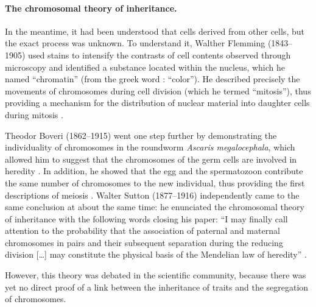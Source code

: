 





\paragraph{The chromosomal theory of inheritance.}
In the meantime, it had been understood that cells derived from other cells, but the exact process was unknown. 
To understand it, Walther Flemming (1843--1905) used stains to intensify the contrasts of cell contents observed through microscopy and identified a substance located within the nucleus, which he named “chromatin” (from the greek word \textit{\textchi\textrho\textomega\textmu\textalpha}: “color”).
He described precisely the movements of chromosomes during cell division (which he termed “mitosis”), thus providing a mechanism for the distribution of nuclear material into daughter cells during mitosis \citep{flemming1879contributions}.

Theodor Boveri (1862--1915) went one step further by demonstrating the individuality of chromosomes in the roundworm \textit{Ascaris megalocephala}, which allowed him to suggest that the chromosomes of the germ cells are involved in heredity \citep{boveri1888zellen}.
In addition, he showed that the egg and the spermatozoon contribute the same number of chromosomes to the new individual, thus providing the first descriptions of meiosis \citep{boveri1890zellen}.
Walter Sutton (1877--1916) independently came to the same conclusion at about the same time: he enunciated the chromosomal theory of inheritance with the following words closing his  paper: “I may finally call attention to the probability that the association of paternal and maternal chromosomes in pairs and their subsequent separation during the reducing division […] may constitute the physical basis of the Mendelian law of heredity” \citep{sutton1902morphology}.

However, this theory was debated in the scientific community, because there was yet no direct proof of a link between the inheritance of traits and the segregation of chromosomes.\\ 

